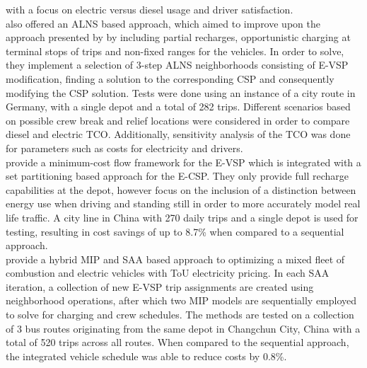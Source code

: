 \documentclass[]{article}
\begin{document}
with a focus on electric versus diesel usage and driver satisfaction. \\
\citet{Sistig2023} also offered an ALNS based approach, which aimed to
improve upon the approach presented by \citet{Perumal2021} by including partial
recharges, opportunistic charging at terminal stops of trips and non-fixed
ranges for the vehicles. In order to solve, they implement a
selection of 3-step ALNS neighborhoods consisting of E-VSP modification,
finding a solution to the corresponding CSP and consequently modifying the CSP
solution. Tests were done using an instance of a city route in Germany, with a
single depot and a total of 282 trips. Different scenarios based on possible
crew break and relief locations were considered in order to compare diesel and
electric TCO. Additionally, sensitivity analysis of the TCO was done for
parameters such as costs for electricity and drivers. \\
\citet{Shen2023} provide a minimum-cost flow framework for the E-VSP which is
integrated with a set partitioning based approach for the E-CSP. They only provide full recharge capabilities at the depot,
however focus on the inclusion of a distinction between energy use when driving
and standing still in order to more accurately model real life traffic. A city
line in China with 270 daily trips and a single depot is used for testing,
resulting in cost savings of up to 8.7\% when compared to a sequential
approach. \\
\citet{Cong2024} provide a hybrid MIP and SAA based approach to optimizing a mixed
fleet of combustion and electric vehicles with ToU electricity pricing. In each SAA iteration, a collection of new E-VSP trip
assignments are created using neighborhood operations, after which two MIP
models are sequentially employed to solve for charging and crew schedules. The
methods are tested on a collection of 3 bus routes originating from the same
depot in Changchun City, China with a total of 520 trips across all routes.
When compared to the sequential approach, the integrated vehicle schedule was
able to reduce costs by 0.8\%. 
\end{document}
